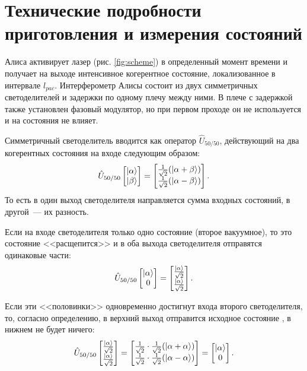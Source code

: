\section[Технические подробности]{Технические подробности приготовления и измерения состояний}
Алиса активирует лазер (рис. \ref{fig:scheme}) в определенный момент времени и получает на выходе интенсивное когерентное состояние, локализованное в интервале $l_{pac}$. 
Интерферометр Алисы состоит из двух симметричных светоделителей и задержки по одному плечу между ними. В плече с задержкой также установлен фазовый модулятор, но при первом проходе он не используется и на состояния не влияет. 

Симметричный светоделитель вводится как оператор $\hat{U}_{50/50}$, действующий на два когерентных состояния на входе следующим образом:
\begin{equation}
  \hat{U}_{50/50} 
  \begin{bmatrix}
    \left| \alpha \right\rangle \\
    \left| \beta \right\rangle
  \end{bmatrix}
  =
  \begin{bmatrix}
    \frac{1}{\sqrt{2}}(\left| \alpha + \beta \right\rangle) \\
    \frac{1}{\sqrt{2}}(\left| \alpha - \beta \right\rangle)
  \end{bmatrix}.
\end{equation}
То есть в один выход светоделителя направляется сумма входных состояний, в другой~--- их разность.

Если на входе светоделителя только одно состояние (второе вакуумное), то это состояние <<расщепится>> и в оба выхода светоделителя отправятся одинаковые части:
\begin{equation}
  \hat{U}_{50/50} 
  \begin{bmatrix}
    \left| \alpha \right\rangle \\
    0
  \end{bmatrix}
  =
  \begin{bmatrix}
    \frac{\left| \alpha \right\rangle}{\sqrt{2}} \\
    \frac{\left| \alpha \right\rangle}{\sqrt{2}}
  \end{bmatrix}.
\end{equation}

Если эти <<половинки>> одновременно достигнут входа второго светоделителя, то, согласно определению, в верхний выход отправится исходное состояние \state{\alpha}, в нижнем не будет ничего:
\begin{equation}
  \hat{U}_{50/50} 
  \begin{bmatrix}
    \frac{\left| \alpha \right\rangle}{\sqrt{2}} \\
    \frac{\left| \alpha \right\rangle}{\sqrt{2}}
  \end{bmatrix}  
  =
  \begin{bmatrix}
    \frac{1}{\sqrt{2}} \cdot \frac{1}{\sqrt{2}}(\left| \alpha+\alpha \right\rangle) \\
    \frac{1}{\sqrt{2}} \cdot \frac{1}{\sqrt{2}}(\left| \alpha-\alpha \right\rangle)
  \end{bmatrix}
  =
  \begin{bmatrix}
    \left| \alpha \right\rangle \\
    0
  \end{bmatrix}.
\end{equation}

